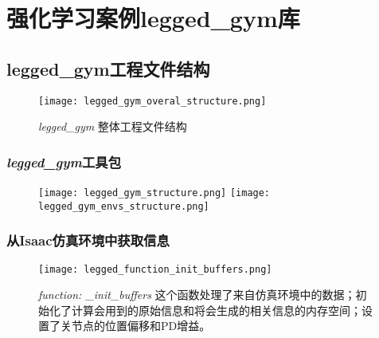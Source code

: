 
\chapter[强化学习案例legged\_gym库]{强化学习案例legged\_gym库}



\section[legged\_gym工程文件结构]{legged\_gym工程文件结构\cite[p1]{Rudin_Hoeller_Reist_Hutter_2021}}

\begin{figure}
  \centering
  \caption{\emph{legged\_gym} 整体工程文件结构}
  \label{fig:legged_gym_overal_structure}
  \texttt{[image: legged\_gym\_overal\_structure.png]}
\end{figure}


\subsection[\emph{legged\_gym}工具包]{\emph{legged\_gym}工具包}
\begin{figure}
  \centering
  {\texttt{[image: legged\_gym\_structure.png]}}
  {\texttt{[image: legged\_gym\_envs\_structure.png]}}
\end{figure}


\subsection[从Isaac仿真环境中获取信息]{从Isaac仿真环境中获取信息}

\begin{figure}
  \centering
  \caption{\emph{function: \_init\_buffers} 这个函数处理了来自仿真环境中的数据；初始化了计算会用到的原始信息和将会生成的相关信息的内存空间；设置了关节点的位置偏移和PD增益。}
  \label{fig:legged_function_init_buffers}
  \texttt{[image: legged\_function\_init\_buffers.png]}
\end{figure}










